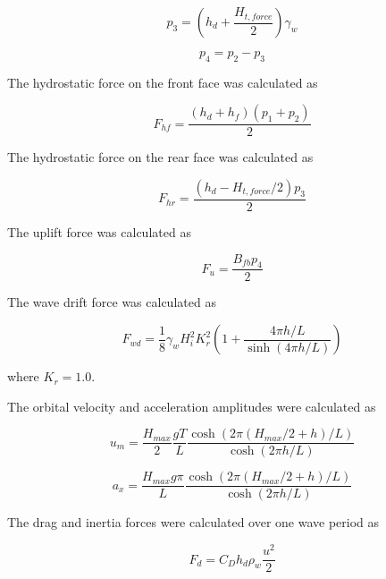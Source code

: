 \documentclass[a4paper, 11pt]{article}
\begin{document}
\begin{equation}
    p_3=\left(h_d+\frac{H_{t,force}}{2}\right)\gamma_w
\end{equation}

\begin{equation}
    p_4=p_2-p_3
\end{equation}

The hydrostatic force on the front face was calculated as

\begin{equation}
    F_{hf}=\frac{(h_d+h_f)(p_1+p_2)}{2}
\end{equation}

The hydrostatic force on the rear face was calculated as

\begin{equation}
    F_{hr}=
    \frac{(h_d-H_{t,force}/2)p_3}{2}
\end{equation}

The uplift force was calculated as

\begin{equation}
    F_u=\frac{B_{fb}p_4}{2}
\end{equation}

The wave drift force was calculated as

\begin{equation}
    F_{wd}
    =
    \frac{1}{8}\gamma_w H_i^2K_r^2
    \left(
    1+
    \frac{4\pi h/L}{\sinh(4\pi h/L)}
    \right)
\end{equation}

where \(K_r=1.0\).

The orbital velocity and acceleration amplitudes were calculated as

\begin{equation}
    u_m=
    \frac{H_{max}}{2}
    \frac{gT}{L}
    \frac{
    \cosh\left(2\pi(H_{max}/2+h)/L\right)
    }
    {
    \cosh(2\pi h/L)
    }
\end{equation}

\begin{equation}
    a_x=
    \frac{H_{max}g\pi}{L}
    \frac{
    \cosh\left(2\pi(H_{max}/2+h)/L\right)
    }
    {
    \cosh(2\pi h/L)
    }
\end{equation}

The drag and inertia forces were calculated over one wave period as

\begin{equation}
    F_d=C_D h_d\rho_w\frac{u^2}{2}
\end{equation}
\end{document}
